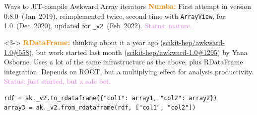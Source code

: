 \documentclass[aspectratio=169]{beamer}
\begin{document}
\begin{frame}[fragile]{Ways to JIT-compile Awkward Array iterators}
\vspace{0.5 cm}
\textcolor{darkorange}{\bf Numba:} First attempt in version 0.8.0~(Jan~2019), reimplemented twice, second time with \texttt{ArrayView}, for 1.0~(Dec~2020), updated for \texttt{_v2}~(Feb~2022). \textcolor{violet}{Status: mature.}

\vspace{0.25 cm}

\vspace{0.25 cm}
\begin{uncoverenv}<3->
\textcolor{darkorange}{\bf RDataFrame:} thinking about it a year ago (\textcolor{blue}{\href{https://github.com/scikit-hep/awkward-1.0/issues/558}{scikit-hep/awkward-1.0\#558}}), but work started last month (\textcolor{blue}{\href{https://github.com/scikit-hep/awkward-1.0/pull/1295}{scikit-hep/awkward-1.0\#1295}}) by Yana Osborne. Uses a lot of the same infrastructure as the above, plus RDataFrame integration. Depends on ROOT, but a multiplying effect for analysis productivity. \textcolor{violet}{Status: just started, but a safe bet.}

\small
\begin{verbatim}
rdf = ak._v2.to_rdataframe({"col1": array1, "col2": array2})
array3 = ak._v2.from_rdataframe(rdf, ["col1", "col2"])
\end{verbatim}
\normalsize
\end{uncoverenv}

\end{frame}
\end{document}

